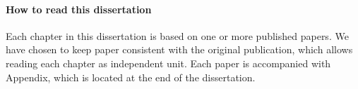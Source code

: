 %

\paragraph{How to read this dissertation}
Each chapter in this dissertation is based on one or more published papers.
We have chosen to keep paper consistent with the original publication, which allows reading each chapter as independent unit. 
Each paper is accompanied with Appendix, which is located at the end of the dissertation.


